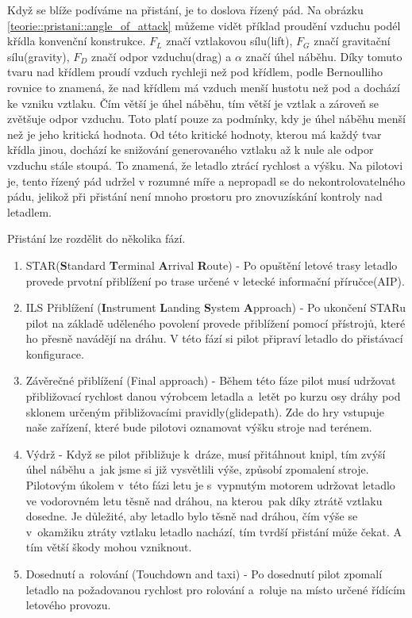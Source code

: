 		Když se blíže podíváme na přistání, je to doslova řízený pád. Na obrázku \ref{teorie::pristani::angle_of_attack} můžeme vidět příklad proudění vzduchu podél křídla konvenční konstrukce. $F_L$ značí vztlakovou sílu(lift), $F_G$ značí gravitační sílu(gravity), $F_D$ značí odpor vzduchu(drag) a $\alpha$ značí úhel náběhu. Díky tomuto tvaru nad křídlem proudí vzduch rychleji než pod křídlem, podle Bernoulliho rovnice to znamená, že nad křídlem má vzduch menší hustotu než pod a dochází ke vzniku vztlaku. Čím větší je úhel náběhu, tím větší je vztlak a zároveň se zvětšuje odpor vzduchu. Toto platí pouze za podmínky, kdy je úhel náběhu menší než je jeho kritická hodnota. Od této kritické hodnoty, kterou má každý tvar křídla jinou, dochází ke snižování generovaného vztlaku až k nule ale odpor vzduchu stále stoupá. To znamená, že letadlo ztrácí rychlost a výšku. Na pilotovi je, tento řízený pád udržel v rozumné míře a nepropadl se do nekontrolovatelného pádu, jelikož při přistání není mnoho prostoru pro znovuzískání kontroly nad letadlem.\par
		Přistání lze rozdělit do několika fází\cite{landingPhases}.
		
		\begin{enumerate}
			\item STAR(\textbf{S}tandard \textbf{T}erminal \textbf{A}rrival \textbf{R}oute) - Po opuštění letové trasy letadlo provede prvotní přiblížení po trase určené v letecké informační příručce(AIP). 
			
			\item ILS Přiblížení (\textbf{I}nstrument \textbf{L}anding \textbf{S}ystem \textbf{A}pproach) - Po ukončení STARu pilot na základě uděleného povolení provede přiblížení pomocí přístrojů, které ho přesně navádějí na dráhu. V této fází si pilot připraví letadlo do přistávací konfigurace.
		
			\item Závěrečné přiblížení (Final approach) - Během této fáze pilot musí udržovat přibližovací rychlost danou výrobcem letadla a~letět po kurzu osy dráhy pod sklonem určeným přibližovacími pravidly(glidepath). Zde do hry vstupuje naše zařízení, které bude pilotovi oznamovat výšku stroje nad terénem.
					
			\item Výdrž - Když se pilot přibližuje k~dráze, musí přitáhnout knipl, tím zvýší úhel náběhu a~jak jsme si již vysvětlili výše, způsobí zpomalení stroje. Pilotovým úkolem v~této fázi letu je s~vypnutým motorem udržovat letadlo ve vodorovném letu těsně nad dráhou, na kterou~pak díky ztrátě vztlaku dosedne. Je důležité, aby letadlo bylo těsně nad dráhou, čím výše se v~okamžiku ztráty vztlaku letadlo nachází, tím tvrdší přistání může čekat. A tím větší škody mohou vzniknout.
					
			\item Dosednutí a~rolování (Touchdown and taxi) - Po dosednutí pilot zpomalí letadlo na požadovanou rychlost pro rolování a~roluje na místo určené řídícím letového provozu. 
		\end{enumerate}
				

